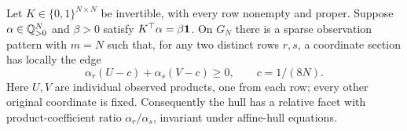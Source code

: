 \begin{lemma}\label{lem:balanced-incidence}
Let $K\in\{0,1\}^{N\times N}$ be invertible, with every row nonempty
and proper. Suppose $\alpha\in\mathbb Q_{>0}^N$ and $\beta>0$ satisfy
$K^\top\alpha=\beta\mathbf 1$. On $G_N$ there is a sparse observation
pattern with $m=N$ such that, for any two distinct rows $r,s$, a
coordinate section has locally the edge
\begin{equation}\label{eq:balanced-edge}
 \alpha_r(U-c)+\alpha_s(V-c)\ge0,
 \qquad c=1/(8N).
\end{equation}
Here $U,V$ are individual observed products, one from each row;
every other original coordinate is fixed. Consequently the hull has a
relative facet with product-coefficient ratio $\alpha_r/\alpha_s$,
invariant under affine-hull equations.
\end{lemma}
